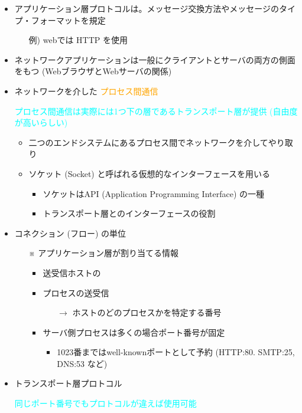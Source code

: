 \begin{itemize}
  \item アプリケーション層プロトコルは。メッセージ交換方法やメッセージのタイプ・フォーマットを規定
  \begin{itemize}
    \item[例)] webでは HTTP を使用
  \end{itemize}
  \item ネットワークアプリケーションは一般にクライアントとサーバの両方の側面をもつ (WebブラウザとWebサーバの関係)
  \item ネットワークを介した \textcolor{orange}{プロセス間通信}
  \item[] \textcolor{cyan}{プロセス間通信は実際には1つ下の層であるトランスポート層が提供 (自由度が高いらしい)}
  \begin{itemize}
    \item 二つのエンドシステムにあるプロセス間でネットワークを介してやり取り
    \item ソケット (Socket) と呼ばれる仮想的なインターフェースを用いる
    \begin{itemize}
      \item ソケットはAPI (Application Programming Interface) の一種
      \item トランスポート層とのインターフェースの役割
    \end{itemize}
  \end{itemize}
  \item コネクション (フロー) の単位
  \begin{itemize}
    \item[※] アプリケーション層が割り当てる情報
    \begin{itemize}
      \item 送受信ホストの   %
      \item プロセスの送受信  %
      \begin{itemize}
        \item[$\rightarrow$] ホストのどのプロセスかを特定する番号
      \end{itemize}
      \item サーバ側プロセスは多くの場合ポート番号が固定
      \begin{itemize}
        \item 1023番まではwell-knownポートとして予約 (HTTP:80. SMTP:25, DNS:53 など)
      \end{itemize}
    \end{itemize}
  \end{itemize}
  \item トランスポート層プロトコル   %
  \item[] \textcolor{cyan}{同じポート番号でもプロトコルが違えば使用可能}
\end{itemize}

